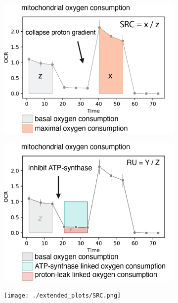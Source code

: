 \documentclass[12pt]{article}
\begin{document}
\begin{figure}[H]
\begin{subfigure}[t]{0.33\textwidth}
        \caption{}
        \includegraphics[width=\textwidth]{./extended_plots/src_cartoon.png}        
    \end{subfigure} 
    \begin{subfigure}[t]{0.33\textwidth}
        \caption{}
        \includegraphics[width=\textwidth]{./main_plots/seahorse_cartoon.png}        
    \end{subfigure}  
    \begin{subfigure}[t]{0.25\textwidth}
        \caption{}
        \texttt{[image: ./extended\_plots/SRC.png]}        
    \end{subfigure} 
\hspace{1cm}

\end{figure}
\end{document}
